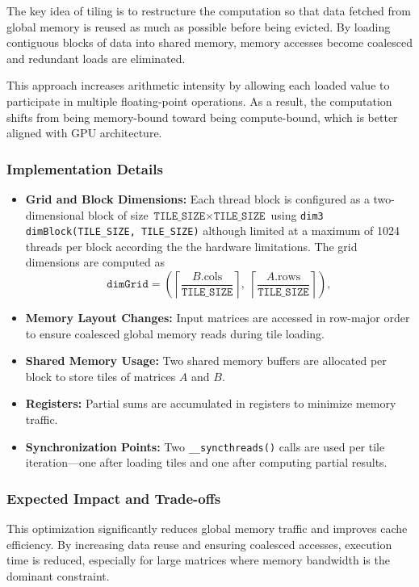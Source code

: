 \documentclass[conference, 12pt]{IEEEtran}
\begin{document}
The key idea of tiling is to restructure the computation so that data fetched from global memory is reused as much as possible before being evicted. By loading contiguous blocks of data into shared memory, memory accesses become coalesced and redundant loads are eliminated.

This approach increases arithmetic intensity by allowing each loaded value to participate in multiple floating-point operations. As a result, the computation shifts from being memory-bound toward being compute-bound, which is better aligned with GPU architecture.

\subsubsection{Implementation Details}
\begin{itemize}
    \item \textbf{Grid and Block Dimensions:} Each thread block is configured as a two-dimensional block of size $\texttt{TILE\_SIZE} \times \texttt{TILE\_SIZE}$ using \texttt{dim3 dimBlock(TILE\_SIZE, TILE\_SIZE)} although limited at a maximum of 1024 threads per block according the the hardware limitations. The grid dimensions are computed as
\[
\texttt{dimGrid} =
\left(
\left\lceil \frac{B.\text{cols}}{\texttt{TILE\_SIZE}} \right\rceil,\;
\left\lceil \frac{A.\text{rows}}{\texttt{TILE\_SIZE}} \right\rceil
\right),
\]
    \item \textbf{Memory Layout Changes:} Input matrices are accessed in row-major order to ensure coalesced global memory reads during tile loading.
    \item \textbf{Shared Memory Usage:} Two shared memory buffers are allocated per block to store tiles of matrices $A$ and $B$.
    \item \textbf{Registers:} Partial sums are accumulated in registers to minimize memory traffic.
    \item \textbf{Synchronization Points:} Two \texttt{\_\_syncthreads()} calls are used per tile iteration—one after loading tiles and one after computing partial results.
\end{itemize}

\subsubsection{Expected Impact and Trade-offs}
This optimization significantly reduces global memory traffic and improves cache efficiency. By increasing data reuse and ensuring coalesced accesses, execution time is reduced, especially for large matrices where memory bandwidth is the dominant constraint.
\end{document}
